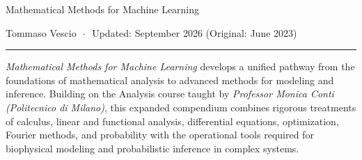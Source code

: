 \documentclass[11pt]{report}
\theoremstyle{bolddefinition}
\theoremstyle{boldplain}
\theoremstyle{boldremark}
\begin{document}
\pagestyle{plain}     

\begin{center}
    {\linespread{1.1}\selectfont
    {\huge Mathematical Methods for Machine Learning\\} 
    }
    \vspace{0.4cm}
    {\large{Tommaso Vescio $\,\cdot\,$ Updated: September 2026 (Original: June 2023)} \par}
\end{center}

\vspace{0.2cm}

\hrule
\vspace{0.15cm}
{\large{\textit{Mathematical Methods for Machine Learning} develops a unified pathway from the foundations of mathematical analysis to advanced methods for modeling and inference. Building on the Analysis course taught by \textit{Professor Monica Conti (Politecnico di Milano)}, this expanded compendium combines rigorous treatments of calculus, linear and functional analysis, differential equations, optimization, Fourier methods, and probability with the operational tools required for biophysical modeling and probabilistic inference in complex systems.} \par}

\renewcommand{\contentsname}{\LARGE\textbf{Contents}} 
\tableofcontents 
\newpage

\pagestyle{fancy}
\fancyhf{}              
\fancyhead[R]{\small\nouppercase{\rightmark}}
\fancyfoot[C]{\thepage}


\newpage

\newpage

\newpage

\newpage

\newpage

\newpage

\newpage

\newpage

\newpage

\newpage

\newpage

\newpage

\newpage

\newpage

\newpage

\clearpage

\end{document}
